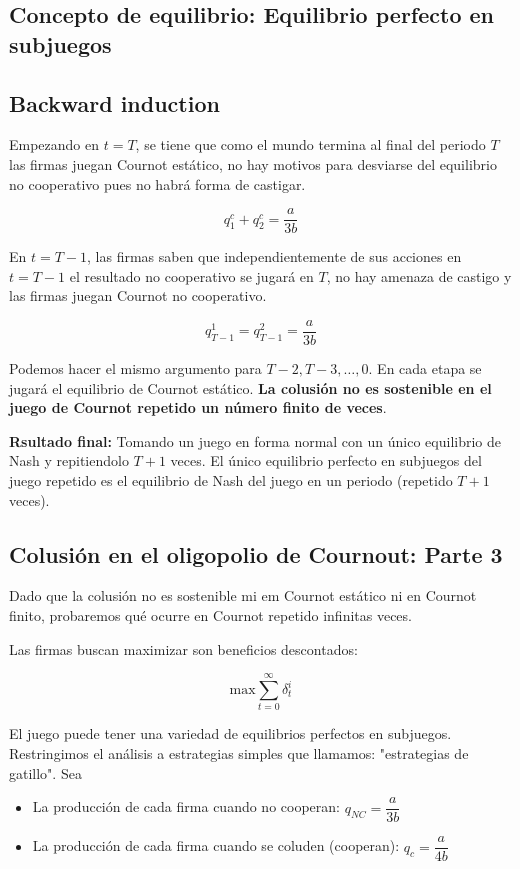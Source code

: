 \documentclass[letterpaper,12pt,twocolumn]{report}
\begin{document}
\subsection*{Concepto de equilibrio: Equilibrio perfecto en subjuegos}

\subsection*{Backward induction}

Empezando en $t=T$, se tiene que como el mundo termina al final del periodo $T$ las firmas juegan Cournot estático, no hay motivos para desviarse del equilibrio no cooperativo pues no habrá forma de castigar.

$$ q_1^c+q_2^c=\dfrac{a}{3b} $$

En $t=T-1$, las firmas saben que independientemente de sus acciones en $t=T-1$ el resultado no cooperativo se jugará en $T$, no hay amenaza de castigo y las firmas juegan Cournot no cooperativo.

$$ q_{T-1}^{1}=q_{T-1}^2=\dfrac{a}{3b} $$

Podemos hacer el mismo argumento para $T-2,T-3,\dots,0$. En cada etapa se jugará el equilibrio de Cournot estático. \textbf{La colusión no es sostenible en el juego de Cournot repetido un número finito de veces}.

\textbf{Rsultado final:} Tomando un juego en forma normal con un único equilibrio de Nash y repitiendolo $T+1$ veces. El único equilibrio perfecto en subjuegos del juego repetido es el equilibrio de Nash del juego en un periodo (repetido $T+1$ veces).

\subsection*{Colusión en el oligopolio de Cournout: Parte 3}

Dado que la colusión no es sostenible mi em Cournot estático ni en Cournot finito, probaremos qué ocurre en Cournot repetido infinitas veces.

Las firmas buscan maximizar son beneficios descontados:

$$\text{max}\sum_{t=0}^{\infty}\delta^i_t $$

El juego puede tener una variedad de equilibrios perfectos en subjuegos. Restringimos el análisis a estrategias simples que llamamos: "estrategias de gatillo". Sea

\begin{itemize}
	\item La producción de cada firma cuando no cooperan: $q_{NC}=\dfrac{a}{3b}$
	\item La producción de cada firma cuando se coluden (cooperan): $q_c=\dfrac{a}{4b}$
\end{itemize}
\end{document}
